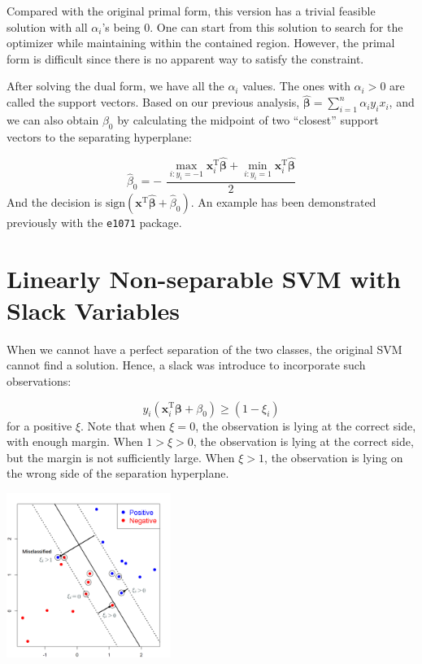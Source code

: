 \documentclass[
]{book}
\theoremstyle{definition}
\theoremstyle{definition}
\theoremstyle{definition}
\theoremstyle{definition}
\theoremstyle{remark}
\begin{document}
Compared with the original primal form, this version has a trivial feasible solution with all \(\alpha_i\)'s being 0. One can start from this solution to search for the optimizer while maintaining within the contained region. However, the primal form is difficult since there is no apparent way to satisfy the constraint.

After solving the dual form, we have all the \(\alpha_i\) values. The ones with \(\alpha_i > 0\) are called the support vectors. Based on our previous analysis, \(\widehat{\boldsymbol \beta} = \sum_{i = 1}^n \alpha_i y_i x_i\), and we can also obtain \(\beta_0\) by calculating the midpoint of two ``closest'' support vectors to the separating hyperplane:

\[\widehat{\beta}_0 = - \,\, \frac{\max_{i: y_i = -1} \mathbf{x}_i^\text{T}\widehat{\boldsymbol \beta} + \min_{i: y_i = 1} \mathbf{x}_i^\text{T}\widehat{\boldsymbol \beta} }{2}\]
And the decision is \(\text{sign}(\mathbf{x}^\text{T}\widehat{\boldsymbol \beta} + \widehat{\beta}_0)\). An example has been demonstrated previously with the \texttt{e1071} package.

\hypertarget{linearly-non-separable-svm-with-slack-variables}{%
\section{Linearly Non-separable SVM with Slack Variables}\label{linearly-non-separable-svm-with-slack-variables}}

When we cannot have a perfect separation of the two classes, the original SVM cannot find a solution. Hence, a slack was introduce to incorporate such observations:

\[y_i (\mathbf{x}_i^\text{T}\boldsymbol \beta+ \beta_0) \geq (1 - \xi_i)\]
for a positive \(\xi\). Note that when \(\xi = 0\), the observation is lying at the correct side, with enough margin. When \(1 > \xi > 0\), the observation is lying at the correct side, but the margin is not sufficiently large. When \(\xi > 1\), the observation is lying on the wrong side of the separation hyperplane.

\includegraphics[width=0.4\textwidth,height=\textheight]{images/SVMslack.png}
\end{document}
